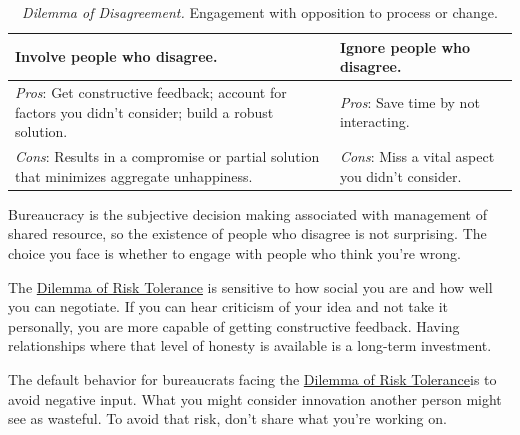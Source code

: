 \begin{center}
\begin{table}[H]
\begin{tabular}{ | m{\dilemmatablewidth}| m{\dilemmatablewidth} | } 
  \hline
  \textbf{Involve people who disagree.} & 
  \textbf{Ignore people who disagree.} \\ 
  \hline
  \textit{Pros}: Get constructive feedback; account for factors you didn't consider; build a robust solution. & 
  \textit{Pros}: Save time by not interacting. \\  
  \hline
  \textit{Cons}: Results in a compromise or partial solution that minimizes aggregate unhappiness. & 
  \textit{Cons}: Miss a vital aspect you didn't consider. \\  
  \hline
\end{tabular}
\caption{\textit{Dilemma of Disagreement.}
Engagement with opposition to process or change.
}
\label{table:opposition}
\end{table}
\end{center}



Bureaucracy is the subjective decision making associated with management of shared resource, so the existence of people who disagree is not surprising. The choice you face is whether to engage with people who think you're wrong. 

The \hyperref[table:risk]{Dilemma of Risk Tolerance} is sensitive to how social you are and how well you can negotiate. If you can hear criticism of your idea and not take it personally, you are more capable of getting constructive feedback. Having relationships where that level of honesty is available is a long-term investment.

%
The default behavior for bureaucrats facing the \hyperref[table:risk]{Dilemma of Risk Tolerance}is to avoid negative input. What you might consider innovation another person might see as wasteful. To avoid that risk, don't share what you're working on.

